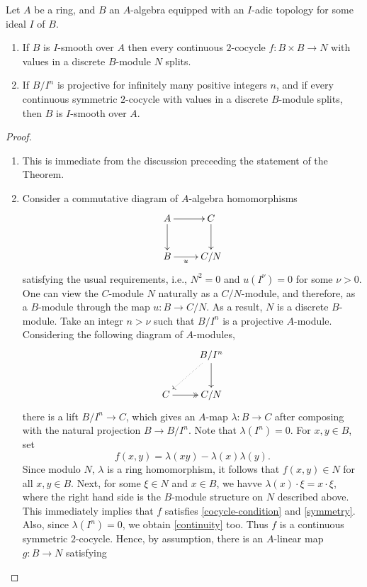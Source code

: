 \begin{theorem}
    Let $A$ be a ring, and $B$ an $A$-algebra equipped with an $I$-adic topology for some ideal $I$ of $B$. 
    \begin{enumerate}[label=(\arabic*)]
        \item If $B$ is $I$-smooth over $A$ then every continuous $2$-cocycle $f\colon B\times B\to N$ with values in a discrete $B$-module $N$ splits. 
        \item If $B/I^n$ is projective for infinitely many positive integers $n$, and if every continuous symmetric $2$-cocycle with values in a discrete $B$-module splits, then $B$ is $I$-smooth over $A$.
    \end{enumerate}
\end{theorem}
\begin{proof}
\begin{enumerate}[label=(\arabic*)]
    \item This is immediate from the discussion preceeding the statement of the Theorem. 
    \item Consider a commutative diagram of $A$-algebra homomorphisms 
    \begin{equation*}
        \xymatrix {
            A\ar[r]\ar[d] & C\ar[d]\\
            B\ar[r]_-u & C/N
        }
    \end{equation*}
    satisfying the usual requirements, i.e., $N^2 = 0$ and $u(I^\nu) = 0$ for some $\nu > 0$. One can view the $C$-module $N$ naturally as a $C/N$-module, and therefore, as a $B$-module through the map $u\colon B\to C/N$. As a result, $N$ is a discrete $B$-module. Take an integr $n > \nu$ such that $B/I^n$ is a projective $A$-module. Considering the following diagram of $A$-modules, 
    \begin{equation*}
        \xymatrix {
            & B/I^n\ar[d]\ar@{.>}[ld]\\
            C\ar@{->>}[r] & C/N
        }
    \end{equation*}
    there is a lift $B/I^n\to C$, which gives an $A$-map $\lambda\colon B\to C$ after composing with the natural projection $B\to B/I^n$. Note that $\lambda(I^n) = 0$. For $x, y\in B$, set 
    \begin{equation*}
        f(x, y) = \lambda(xy) - \lambda(x)\lambda(y).
    \end{equation*}
    Since modulo $N$, $\lambda$ is a ring homomorphism, it follows that $f(x, y)\in N$ for all $x,y\in B$. Next, for some $\xi\in N$ and $x\in B$, we havve $\lambda(x)\cdot\xi = x\cdot\xi$, where the right hand side is the $B$-module structure on $N$ described above. This immediately implies that $f$ satisfies \ref{cocycle-condition} and \ref{symmetry}. Also, since $\lambda(I^n) = 0$, we obtain \ref{continuity} too. Thus $f$ is a continuous symmetric $2$-cocycle. Hence, by assumption, there is an $A$-linear map $g\colon B\to N$ satisfying 

\end{enumerate}
\end{proof}
